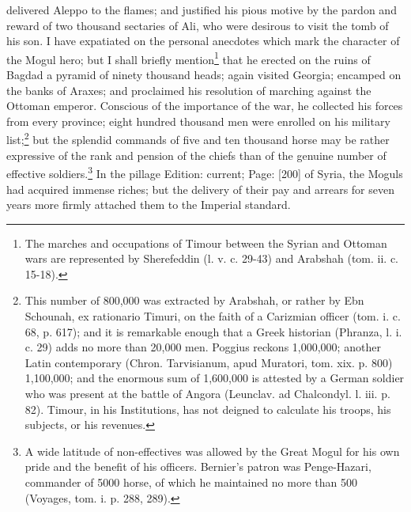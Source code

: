 delivered Aleppo to the flames; and justified his pious motive by the pardon and reward of two thousand sectaries of Ali, who were desirous to visit the tomb of his son. I have expatiated on the personal anecdotes which mark the character of the Mogul hero; but I shall briefly mention\footnote{The marches and occupations of Timour between the Syrian and Ottoman wars are represented by Sherefeddin (l. v. c. 29-43) and Arabshah (tom. ii. c. 15-18).} that he erected on the ruins of Bagdad a pyramid of ninety thousand heads; again visited Georgia; encamped on the banks of Araxes; and proclaimed his resolution of marching against the Ottoman emperor. Conscious of the importance of the war, he collected his forces from every province; eight hundred thousand men were enrolled on his military list;\footnote{This number of 800,000 was extracted by Arabshah, or rather by Ebn Schounah, ex rationario Timuri, on the faith of a Carizmian officer (tom. i. c. 68, p. 617); and it is remarkable enough that a Greek historian (Phranza, l. i. c. 29) adds no more than 20,000 men. Poggius reckons 1,000,000; another Latin contemporary (Chron. Tarvisianum, apud Muratori, tom. xix. p. 800) 1,100,000; and the enormous sum of 1,600,000 is attested by a German soldier who was present at the battle of Angora (Leunclav. ad Chalcondyl. l. iii. p. 82). Timour, in his Institutions, has not deigned to calculate his troops, his subjects, or his revenues.} but the splendid commands of five and ten thousand horse may be rather expressive of the rank and pension of the chiefs than of the genuine number of effective soldiers.\footnote{A wide latitude of non-effectives was allowed by the Great Mogul for his own pride and the benefit of his officers. Bernier\texthebrew{}’s patron was Penge-Hazari, commander of 5000 horse, of which he maintained no more than 500 (Voyages, tom. i. p. 288, 289).} In the pillage Edition: current; Page: [200] of Syria, the Moguls had acquired immense riches; but the delivery of their pay and arrears for seven years more firmly attached them to the Imperial standard.

